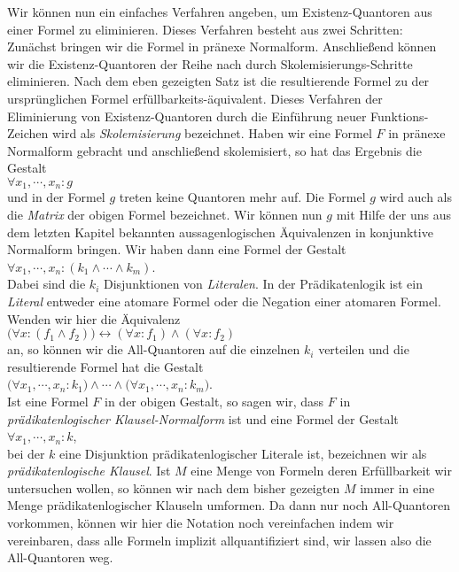 Wir k\"{o}nnen nun ein einfaches Verfahren angeben, um Existenz-Quantoren aus einer Formel
zu eliminieren.  Dieses Verfahren besteht aus zwei Schritten:  Zun\"{a}chst bringen wir die Formel
in pr\"{a}nexe Normalform. Anschlie\ss{}end k\"{o}nnen wir die Existenz-Quantoren der Reihe nach durch 
Skolemisierungs-Schritte eliminieren.  Nach dem eben gezeigten Satz ist die resultierende 
Formel zu der urspr\"{u}nglichen Formel erf\"{u}llbarkeits-\"{a}quivalent.  Dieses
Verfahren der Eliminierung von Existenz-Quantoren durch die Einf\"{u}hrung neuer
Funktions-Zeichen wird als {\emph{\color{blue}Skolemisierung}} bezeichnet.  Haben wir eine Formel $F$
in pr\"{a}nexe Normalform gebracht und anschlie\ss{}end skolemisiert, so hat das Ergebnis die Gestalt\\[0.2cm]
\hspace*{1.3cm} $\forall x_1, \cdots, x_n: g$ \\[0.2cm]
und in der Formel $g$ treten keine Quantoren mehr auf.  Die Formel $g$ wird auch als die
{\emph{\color{blue}Matrix}} der obigen Formel bezeichnet.  Wir k\"{o}nnen nun  $g$ mit Hilfe
der uns aus dem letzten Kapitel bekannten aussagenlogischen
 \"{A}quivalenzen in konjunktive Normalform bringen.  Wir haben dann eine
Formel der Gestalt \\[0.2cm]
\hspace*{1.3cm} $\forall x_1, \cdots, x_n: (k_1 \wedge \cdots \wedge k_m)$. \\[0.2cm]
Dabei sind die $k_i$ Disjunktionen von {\emph{\color{blue}Literalen}}.  In der Pr\"{a}dikatenlogik ist ein
{\emph{\color{blue}Literal}} entweder eine atomare Formel oder die Negation einer atomaren Formel.  Wenden wir
hier  die \"{A}quivalenz 
\\[0.2cm]
\hspace*{1.3cm}
$\bigl(\forall x\colon (f_1\wedge f_2)\bigr) \leftrightarrow (\forall x\colon f_1) \wedge (\forall x\colon f_2)$
\\[0.2cm]
an, so k\"{o}nnen wir die All-Quantoren auf die einzelnen $k_i$ verteilen und
die resultierende Formel hat die Gestalt \\[0.2cm]
\hspace*{1.3cm} 
$\big(\forall x_1, \cdots, x_n: k_1\big) \wedge \cdots \wedge \big(\forall x_1, \cdots, x_n: k_m\big)$. \\[0.2cm]
Ist eine Formel $F$ in der obigen
Gestalt, so sagen wir, dass $F$ in {\emph{\color{blue}pr\"{a}dikatenlogischer Klausel-Normalform}} ist und eine
Formel der Gestalt \\[0.2cm]
\hspace*{1.3cm} $\forall x_1, \cdots, x_n: k$, \\[0.2cm]
bei der $k$ eine Disjunktion pr\"{a}dikatenlogischer Literale ist,
bezeichnen wir als {\emph{\color{blue}pr\"{a}dikatenlogische Klausel}}.  Ist $M$
eine Menge von Formeln deren Erf\"{u}llbarkeit wir untersuchen wollen, so k\"{o}nnen wir nach dem
bisher gezeigten $M$ immer in eine Menge pr\"{a}dikatenlogischer Klauseln umformen.
Da  dann nur noch All-Quantoren vorkommen, k\"{o}nnen wir hier die  Notation noch vereinfachen
indem wir vereinbaren, dass alle Formeln implizit allquantifiziert sind, wir lassen also
die All-Quantoren weg.

